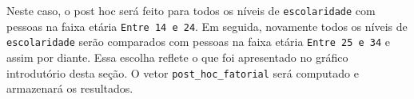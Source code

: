 \documentclass[
]{book}
\newenvironment{Shaded}{\begin{snugshade}}{\end{snugshade}}
\newcommand{\DataTypeTok}[1]{\textcolor[rgb]{0.13,0.29,0.53}{#1}}
\newcommand{\KeywordTok}[1]{\textcolor[rgb]{0.13,0.29,0.53}{\textbf{#1}}}
\newcommand{\NormalTok}[1]{#1}
\newcommand{\OperatorTok}[1]{\textcolor[rgb]{0.81,0.36,0.00}{\textbf{#1}}}
\newcommand{\StringTok}[1]{\textcolor[rgb]{0.31,0.60,0.02}{#1}}
\begin{document}
Neste caso, o post hoc será feito para todos os níveis de \texttt{escolaridade} com pessoas na faixa etária \texttt{Entre\ 14\ e\ 24}. Em seguida, novamente todos os níveis de \texttt{escolaridade} serão comparados com pessoas na faixa etária \texttt{Entre\ 25\ e\ 34} e assim por diante. Essa escolha reflete o que foi apresentado no gráfico introdutório desta seção. O vetor \texttt{post\_hoc\_fatorial} será computado e armazenará os resultados.

\begin{Shaded}
\end{Shaded}
\end{document}
